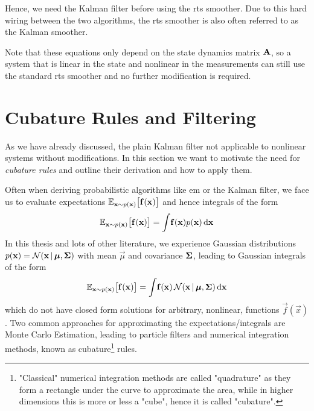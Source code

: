 		Hence, we need the Kalman filter before using the \ac{rts} smoother. Due to this hard wiring between the two algorithms, the \ac{rts} smoother is also often referred to as the Kalman smoother.

		Note that these equations only depend on the state dynamics matrix \( \boldsymbol{\mathrm{A}} \), so a system that is linear in the state and nonlinear in the measurements can still use the standard \ac{rts} smoother and no further modification is required.

\section{Cubature Rules and Filtering}
	\label{sec:cubatureRules}

	As we have already discussed, the plain Kalman filter not applicable to nonlinear systems without modifications. In this section we want to motivate the need for \emph{cubature rules} and outline their derivation and how to apply them.

	Often when deriving probabilistic algorithms like \ac{em} or the Kalman filter, we face us to evaluate expectations \( \mathbb{E}_{\boldsymbol{\mathrm{x}} \sim p(\boldsymbol{\mathrm{x}})}\big[ \boldsymbol{\mathrm{f}}(\boldsymbol{\mathrm{x}}) \big] \) and hence integrals of the form
	\begin{equation*}
		\mathbb{E}_{\boldsymbol{\mathrm{x}} \sim p(\boldsymbol{\mathrm{x}})}\big[ \boldsymbol{\mathrm{f}}(\boldsymbol{\mathrm{x}}) \big] = \int\! \boldsymbol{\mathrm{f}}(\boldsymbol{\mathrm{x}}) p(\boldsymbol{\mathrm{x}}) \dd{\boldsymbol{\mathrm{x}}}
	\end{equation*}
	In this thesis and lots of other literature, we experience Gaussian distributions \( p(\boldsymbol{\mathrm{x}}) = \mathcal{N}(\boldsymbol{\mathrm{x}} \,\vert\, \boldsymbol{\mathrm{\mu}}, \boldsymbol{\mathrm{\Sigma}}) \) with mean \(\vec{\mu}\) and covariance \(\boldsymbol{\mathrm{\Sigma}}\), leading to Gaussian integrals of the form
	\begin{equation*}
		\mathbb{E}_{\boldsymbol{\mathrm{x}} \sim p(\boldsymbol{\mathrm{x}})}\big[ \boldsymbol{\mathrm{f}}(\boldsymbol{\mathrm{x}}) \big] = \int\! \boldsymbol{\mathrm{f}}(\boldsymbol{\mathrm{x}}) \, \mathcal{N}(\boldsymbol{\mathrm{x}} \,\vert\, \boldsymbol{\mathrm{\mu}}, \boldsymbol{\mathrm{\Sigma}}) \dd{\boldsymbol{\mathrm{x}}}
	\end{equation*}
	which do not have closed form solutions for arbitrary, nonlinear, functions \( \vec{f}(\vec{x}) \). Two common approaches for approximating the expectations/integrals are Monte Carlo Estimation, leading to particle filters and numerical integration methods, known as cubature\footnote{"Classical" numerical integration methods are called "quadrature" as they form a rectangle under the curve to approximate the area, while in higher dimensions this is more or less a "cube", hence it is called "cubature".} rules.

